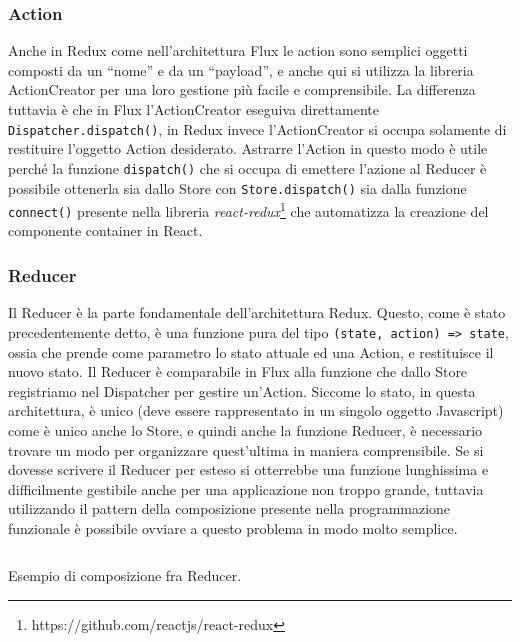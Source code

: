 \subsubsection*{Action}
Anche in Redux come nell'architettura Flux le action sono semplici oggetti composti da un “nome” e da un “payload”, e anche qui si utilizza la libreria ActionCreator per una loro gestione più facile e comprensibile. La differenza tuttavia è che in Flux l'ActionCreator eseguiva direttamente \texttt{Dispatcher.dispatch()}, in Redux invece l'ActionCreator si occupa solamente di restituire l'oggetto Action desiderato. Astrarre l'Action in questo modo è utile perché la funzione \texttt{dispatch()} che si occupa di emettere l'azione al Reducer è possibile ottenerla sia dallo Store con \texttt{Store.dispatch()} sia dalla funzione \texttt{connect()} presente nella libreria \textit{react-redux}\footnote{https://github.com/reactjs/react-redux} che automatizza la creazione del componente container in React.

\subsubsection*{Reducer}
Il Reducer è la parte fondamentale dell'architettura Redux. Questo, come è stato precedentemente detto, è una funzione pura del tipo \texttt{(state, action) => state}, ossia che prende come parametro lo stato attuale ed una Action, e restituisce il nuovo stato. Il Reducer è comparabile in Flux alla funzione che dallo Store registriamo nel Dispatcher per gestire un'Action.
Siccome lo stato, in questa architettura, è unico (deve essere rappresentato in un singolo oggetto Javascript) come è unico anche lo Store, e quindi anche la funzione Reducer, è necessario trovare un modo per organizzare quest'ultima in maniera comprensibile. Se si dovesse scrivere il Reducer per esteso si otterrebbe una funzione lunghissima e difficilmente gestibile anche per una applicazione non troppo grande, tuttavia utilizzando il pattern della composizione presente nella programmazione funzionale è possibile ovviare a questo problema in modo molto semplice.

\begin{listing}[ht]
\inputminted{javascript}{sources/exampleReduxReducer.js}
\caption{Esempio di composizione fra Reducer.} 
\label{exampleReduxReducer} 
\end{listing}
